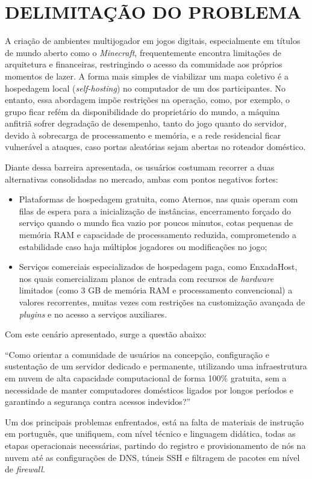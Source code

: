 

\chapter{DELIMITAÇÃO DO PROBLEMA}
\label{capitulo-delimitacao}

A criação de ambientes multijogador em jogos digitais, especialmente em títulos de mundo aberto como o \textit{Minecraft}, frequentemente encontra limitações de arquitetura e financeiras, restringindo o acesso da comunidade aos próprios momentos de lazer. A forma mais simples de viabilizar um mapa coletivo é a hospedagem local (\textit{self-hosting}) no computador de um dos participantes. No entanto, essa abordagem impõe restrições na operação, como, por exemplo, o grupo ficar refém da disponibilidade do proprietário do mundo, a máquina anfitriã sofrer degradação de desempenho, tanto do jogo quanto do servidor, devido à sobrecarga de processamento e memória, e a rede residencial ficar vulnerável a ataques, caso portas aleatórias sejam abertas no roteador doméstico.

Diante dessa barreira apresentada, os usuários costumam recorrer a duas alternativas consolidadas no mercado, ambas com pontos negativos fortes:
\begin{itemize}
    \item Plataformas de hospedagem gratuita, como Aternos, nas quais operam com filas de espera para a inicialização de instâncias, encerramento forçado do serviço quando o mundo fica vazio por poucos minutos, cotas pequenas de memória RAM e capacidade de processamento reduzida, comprometendo a estabilidade caso haja múltiplos jogadores ou modificações no jogo;
    \item Serviços comerciais especializados de hospedagem paga, como EnxadaHost, nos quais comercializam planos de entrada com recursos de \textit{hardware} limitados (como 3 GB de memória RAM e processamento convencional) a valores recorrentes, muitas vezes com restrições na customização avançada de \textit{plugins} e no acesso a serviços auxiliares.
\end{itemize}

Com este cenário apresentado, surge a questão abaixo: 

``Como orientar a comunidade de usuários na concepção, configuração e sustentação de um servidor dedicado e permanente, utilizando uma infraestrutura em nuvem de alta capacidade computacional de forma 100\% gratuita, sem a necessidade de manter computadores domésticos ligados por longos períodos e garantindo a segurança contra acessos indevidos?''

Um dos principais problemas enfrentados, está na falta de materiais de instrução em português, que unifiquem, com nível técnico e linguagem didática, todas as etapas operacionais necessárias, partindo do registro e provisionamento de nós na nuvem até as configurações de DNS, túneis SSH e filtragem de pacotes em nível de \textit{firewall}.